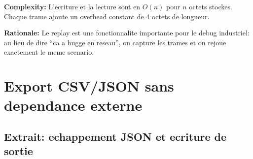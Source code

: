 \documentclass[10pt,a4paper]{article}
\newcommand{\complexity}[1]{\textbf{Complexity:} #1}
\newcommand{\rationale}[1]{\textbf{Rationale:} #1}
\begin{document}
\complexity{L'ecriture et la lecture sont en $O(n)$ pour $n$ octets stockes. Chaque trame ajoute un overhead constant de 4 octets de longueur.}

\rationale{Le replay est une fonctionnalite importante pour le debug industriel: au lieu de dire ``ca a bugge en reseau'', on capture les trames et on rejoue exactement le meme scenario.}

\section{Export CSV/JSON sans dependance externe}

\subsection{Extrait: echappement JSON et ecriture de sortie}
\end{document}
